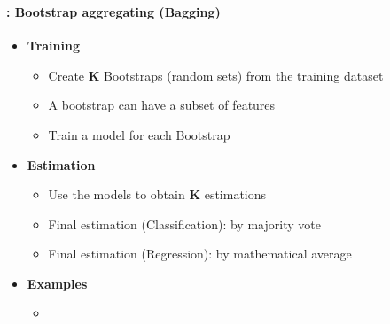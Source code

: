 \documentclass[xcolor=table]{beamer}
\begin{document}
\begin{frame}
	\frametitle{\insertsection}
	\framesubtitle{\insertsubsection: Bootstrap aggregating (Bagging)}
	
	\begin{itemize}
		\item \textbf{Training}
		\begin{itemize}
			\item Create \textbf{K} Bootstraps (random sets) from the training dataset
			\item A bootstrap can have a subset of features
			\item Train a model for each Bootstrap
		\end{itemize}
		\item \textbf{Estimation}
		\begin{itemize}
			\item Use the models to obtain \textbf{K} estimations
			\item Final estimation (Classification): by majority vote
			\item Final estimation (Regression): by mathematical average
		\end{itemize}
		\item \textbf{Examples}
		\begin{itemize}
			\item {}
		\end{itemize}
	\end{itemize}
	
\end{frame}
\end{document}
